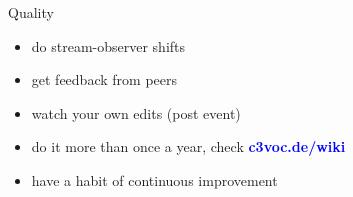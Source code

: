\documentclass[aspectratio=169]{beamer}
\begin{document}
\begin{frame}{Quality}
\begin{itemize}
\item do stream-observer shifts %
\item get feedback from peers %
\item watch your own edits (post event) %
\item do it more than once a year, check \textcolor{blue}{\textbf{c3voc.de/wiki }} %
\item have a habit of continuous improvement %
\end{itemize} 
\end{frame}

\end{document}
